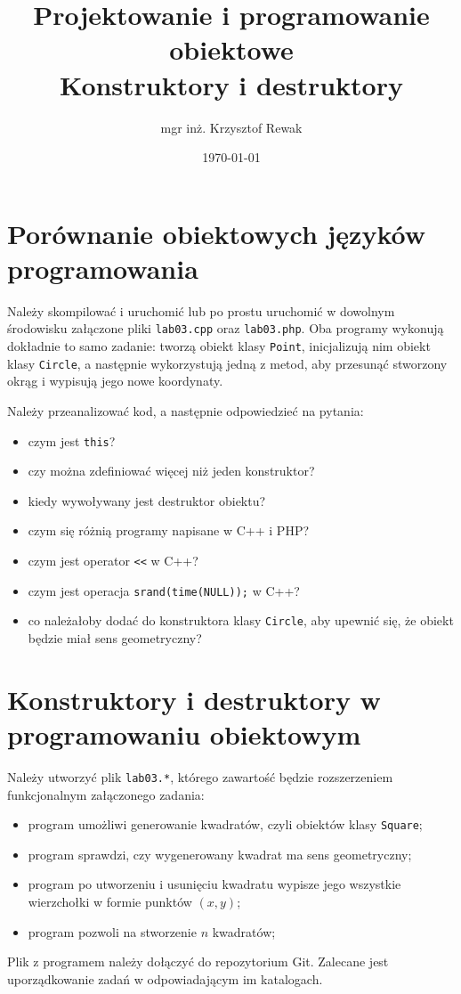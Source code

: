 \documentclass{article}
\title{
	Projektowanie i programowanie obiektowe \\
	\Huge{Konstruktory i destruktory}
}
\author{mgr inż. Krzysztof Rewak}
\date{\today}
\begin{document}
	\maketitle

	\section{Porównanie obiektowych języków programowania}
	Należy skompilować i uruchomić lub po prostu uruchomić w dowolnym środowisku załączone pliki \texttt{lab03.cpp} oraz \texttt{lab03.php}. Oba programy wykonują dokładnie to samo zadanie: tworzą obiekt klasy \texttt{Point}, inicjalizują nim obiekt klasy \texttt{Circle}, a następnie wykorzystują jedną z metod, aby przesunąć stworzony okrąg i wypisują jego nowe koordynaty.
	
	Należy przeanalizować kod, a następnie odpowiedzieć na pytania:
	\begin{itemize}
		\item czym jest \texttt{this}?
		\item czy można zdefiniować więcej niż jeden konstruktor?
		\item kiedy wywoływany jest destruktor obiektu?
		\item czym się różnią programy napisane w C++ i PHP?
		\item czym jest operator \texttt{<<} w C++?
		\item czym jest operacja \texttt{srand(time(NULL));} w C++?
		\item co należałoby dodać do konstruktora klasy \texttt{Circle}, aby upewnić się, że obiekt będzie miał sens geometryczny?
	\end{itemize}

	\section{Konstruktory i destruktory w programowaniu obiektowym}
	Należy utworzyć plik \texttt{lab03.*}, którego zawartość będzie rozszerzeniem funkcjonalnym załączonego zadania:
	\begin{itemize}
		\item program umożliwi generowanie kwadratów, czyli obiektów klasy \texttt{Square};
		\item program sprawdzi, czy wygenerowany kwadrat ma sens geometryczny;
		\item program po utworzeniu i usunięciu kwadratu wypisze jego wszystkie wierzchołki w formie punktów $(x, y)$;
		\item program pozwoli na stworzenie $n$ kwadratów;
	\end{itemize}
	
	Plik z programem należy dołączyć do repozytorium Git. Zalecane jest uporządkowanie zadań w odpowiadającym im katalogach.
\end{document}
